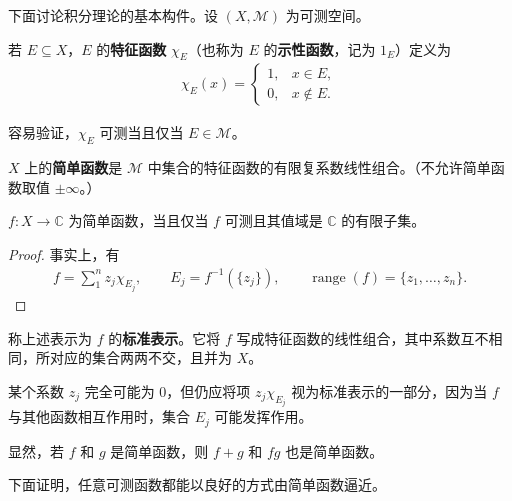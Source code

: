 \documentclass[../../main.tex]{subfiles}%
\begin{document}
下面讨论积分理论的基本构件。设 $(X,\mathscr{M})$ 为可测空间。
\begin{definition}[特征函数]\label{definition:ch02-characteristic-function}
若 $E\subseteq X$，$E$ 的\textbf{特征函数} $\chi_E$（也称为 $E$ 的\textbf{示性函数}，记为 $1_E$）定义为
\begin{align*}
\chi_E(x)=\begin{cases}1,&x\in E,\\0,&x\notin E.\end{cases}
\end{align*}
\end{definition}
\begin{remark}
容易验证，$\chi_E$ 可测当且仅当 $E\in\mathscr{M}$。
\end{remark}
\begin{definition}[简单函数]\label{definition:ch02-simple-function}
$X$ 上的\textbf{简单函数}是 $\mathscr{M}$ 中集合的特征函数的有限复系数线性组合。（不允许简单函数取值 $\pm\infty$。）
\end{definition}
\begin{proposition}\label{proposition:ch02-simple-finite-range}
$f:X\to\mathbb{C}$ 为简单函数，当且仅当 $f$ 可测且其值域是 $\mathbb{C}$ 的有限子集。
\end{proposition}
\begin{proof}
事实上，有
\begin{align*}
f=\sum_1^n z_j\chi_{E_j},\qquad
E_j=f^{-1}(\{z_j\}),\qquad\operatorname{range}(f)=\{z_1,\ldots,z_n\}.
\end{align*}
\end{proof}
\begin{definition}[标准表示]\label{definition:ch02-standard-representation}
称上述表示为 $f$ 的\textbf{标准表示}。它将 $f$ 写成特征函数的线性组合，其中系数互不相同，所对应的集合两两不交，且并为 $X$。
\end{definition}
\begin{remark}
某个系数 $z_j$ 完全可能为 $0$，但仍应将项 $z_j\chi_{E_j}$ 视为标准表示的一部分，因为当 $f$ 与其他函数相互作用时，集合 $E_j$ 可能发挥作用。
\end{remark}
\begin{proposition}\label{proposition:ch02-simple-algebra}
显然，若 $f$ 和 $g$ 是简单函数，则 $f+g$ 和 $fg$ 也是简单函数。
\end{proposition}
下面证明，任意可测函数都能以良好的方式由简单函数逼近。
\end{document}
